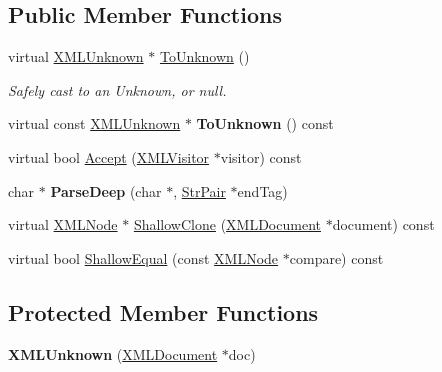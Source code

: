 \subsection*{Public Member Functions}
\begin{DoxyCompactItemize}
\item 
virtual \hyperlink{classtinyxml2_1_1_x_m_l_unknown}{X\+M\+L\+Unknown} $\ast$ \hyperlink{classtinyxml2_1_1_x_m_l_unknown_af4374856421921cad578c8affae872b6}{To\+Unknown} ()\hypertarget{classtinyxml2_1_1_x_m_l_unknown_af4374856421921cad578c8affae872b6}{}\label{classtinyxml2_1_1_x_m_l_unknown_af4374856421921cad578c8affae872b6}

\begin{DoxyCompactList}\small\item\em Safely cast to an Unknown, or null. \end{DoxyCompactList}\item 
virtual const \hyperlink{classtinyxml2_1_1_x_m_l_unknown}{X\+M\+L\+Unknown} $\ast$ {\bfseries To\+Unknown} () const \hypertarget{classtinyxml2_1_1_x_m_l_unknown_a257987e79955399e6e9f119b58d4bb30}{}\label{classtinyxml2_1_1_x_m_l_unknown_a257987e79955399e6e9f119b58d4bb30}

\item 
virtual bool \hyperlink{classtinyxml2_1_1_x_m_l_unknown_ac691f4efd84cad997b93c158e391e461}{Accept} (\hyperlink{classtinyxml2_1_1_x_m_l_visitor}{X\+M\+L\+Visitor} $\ast$visitor) const 
\item 
char $\ast$ {\bfseries Parse\+Deep} (char $\ast$, \hyperlink{classtinyxml2_1_1_str_pair}{Str\+Pair} $\ast$end\+Tag)\hypertarget{classtinyxml2_1_1_x_m_l_unknown_aa2d7b6bce2e6299247f5b83873ff215d}{}\label{classtinyxml2_1_1_x_m_l_unknown_aa2d7b6bce2e6299247f5b83873ff215d}

\item 
virtual \hyperlink{classtinyxml2_1_1_x_m_l_node}{X\+M\+L\+Node} $\ast$ \hyperlink{classtinyxml2_1_1_x_m_l_unknown_a85892945cf7f657375060db7518963c8}{Shallow\+Clone} (\hyperlink{classtinyxml2_1_1_x_m_l_document}{X\+M\+L\+Document} $\ast$document) const 
\item 
virtual bool \hyperlink{classtinyxml2_1_1_x_m_l_unknown_a9984ca7c35092be6f6f5d3dee47a9de7}{Shallow\+Equal} (const \hyperlink{classtinyxml2_1_1_x_m_l_node}{X\+M\+L\+Node} $\ast$compare) const 
\end{DoxyCompactItemize}
\subsection*{Protected Member Functions}
\begin{DoxyCompactItemize}
\item 
{\bfseries X\+M\+L\+Unknown} (\hyperlink{classtinyxml2_1_1_x_m_l_document}{X\+M\+L\+Document} $\ast$doc)\hypertarget{classtinyxml2_1_1_x_m_l_unknown_a9391eb679598d50baba424e6f1aa367b}{}\label{classtinyxml2_1_1_x_m_l_unknown_a9391eb679598d50baba424e6f1aa367b}

\end{DoxyCompactItemize}
